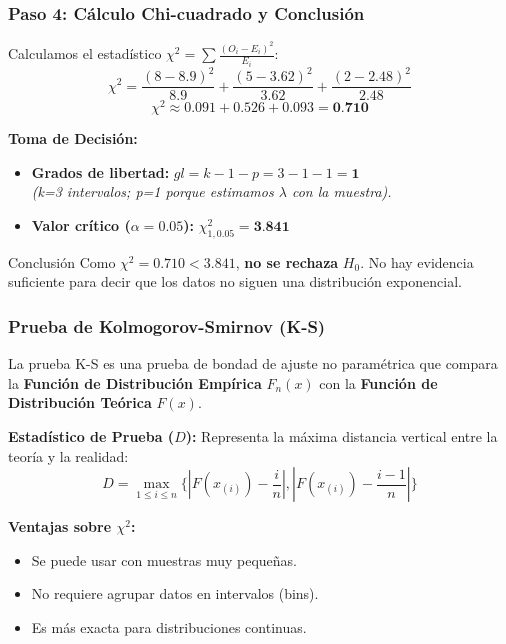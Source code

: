 \documentclass[aspectratio=1610, 10pt]{beamer}
\begin{document}
\begin{frame}
\frametitle{Paso 4: Cálculo Chi-cuadrado y Conclusión}
Calculamos el estadístico $\chi^2 = \sum \frac{(O_i - E_i)^2}{E_i}$:
$$ \chi^2 = \frac{(8 - 8.9)^2}{8.9} + \frac{(5 - 3.62)^2}{3.62} + \frac{(2 - 2.48)^2}{2.48} $$
$$ \chi^2 \approx 0.091 + 0.526 + 0.093 = \textbf{0.710} $$

\vspace{0.3cm}
\textbf{Toma de Decisión:}
\begin{itemize}
    \item \textbf{Grados de libertad:} $gl = k - 1 - p = 3 - 1 - 1 = \textbf{1}$ \\
    \textit{(k=3 intervalos; p=1 porque estimamos $\lambda$ con la muestra).}
    \item \textbf{Valor crítico ($\alpha = 0.05$):} $\chi^2_{1, 0.05} = \textbf{3.841}$
\end{itemize}

\vspace{0.2cm}
\begin{block}{Conclusión}
Como $\chi^2 = 0.710 < 3.841$, \textbf{no se rechaza} $H_0$. No hay evidencia suficiente para decir que los datos no siguen una distribución exponencial.
\end{block}
\end{frame}


\begin{frame}
\frametitle{Prueba de Kolmogorov-Smirnov (K-S)}
La prueba K-S es una prueba de bondad de ajuste no paramétrica que compara la \textbf{Función de Distribución Empírica} $F_n(x)$ con la \textbf{Función de Distribución Teórica} $F(x)$.

\vspace{0.3cm}
\textbf{Estadístico de Prueba ($D$):}
Representa la máxima distancia vertical entre la teoría y la realidad:
$$D = \max_{1 \leq i \leq n} \{ |F(x_{(i)}) - \frac{i}{n}|, |F(x_{(i)}) - \frac{i-1}{n}| \}$$

\vspace{0.2cm}
\textbf{Ventajas sobre $\chi^2$:}
\begin{itemize}
    \item Se puede usar con muestras muy pequeñas.
    \item No requiere agrupar datos en intervalos (bins).
    \item Es más exacta para distribuciones continuas.
\end{itemize}
\end{frame}
\end{document}
